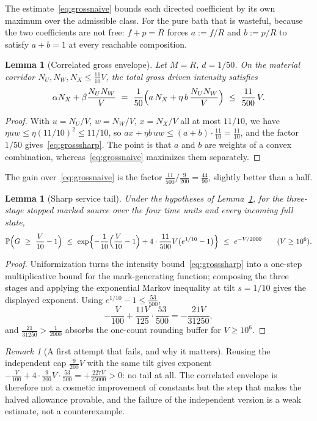 \documentclass[11pt,a4paper]{article}
\theoremstyle{plain}
\newtheorem{lemma}[theorem]{Lemma}
\theoremstyle{definition}
\theoremstyle{remark}
\newtheorem{remark}[theorem]{Remark}
\newcommand{\Prob}{\mathbb P}
\begin{document}
The estimate~\eqref{eq:grossnaive} bounds each directed coefficient by its own maximum over the admissible class. For the pure bath that is wasteful, because the two coefficients are not free: $f+p=R$ forces $a:=f/R$ and $b:=p/R$ to satisfy $a+b=1$ at every reachable composition.

\begin{lemma}[Correlated gross envelope]\label{lem:envelope}
Let $M=R$, $d=1/50$. On the material corridor $N_U,N_W,N_X\le\tfrac{11}{10}V$, the total gross driven intensity satisfies
\begin{equation}\label{eq:grosssharp}
\alpha N_X+\beta\frac{N_UN_W}V\ =\ \frac1{50}\Bigl(a\,N_X+\eta\,b\,\frac{N_UN_W}{V}\Bigr)\ \le\ \frac{11}{500}\,V .
\end{equation}
\end{lemma}
\begin{proof}
With $u=N_U/V$, $w=N_W/V$, $x=N_X/V$ all at most $11/10$, we have $\eta uw\le\eta(11/10)^2\le11/10$, so $ax+\eta b\,uw\le(a+b)\cdot\tfrac{11}{10}=\tfrac{11}{10}$, and the factor $1/50$ gives~\eqref{eq:grosssharp}. The point is that $a$ and $b$ are weights of a convex combination, whereas~\eqref{eq:grossnaive} maximizes them separately.
\end{proof}
The gain over~\eqref{eq:grossnaive} is the factor $\tfrac{11}{500}\big/\tfrac9{200}=\tfrac{44}{90}$, slightly better than a half.

\begin{lemma}[Sharp service tail]\label{lem:sharptail}
Under the hypotheses of Lemma~\ref{lem:envelope}, for the three-stage stopped marked source over the four time units and every incoming full state,
\[
\Prob\Bigl(G\ \ge\ \frac V{10}-1\Bigr)\ \le\ \exp\Bigl\{-\frac1{10}\Bigl(\frac V{10}-1\Bigr)+4\cdot\frac{11}{500}V\bigl(e^{1/10}-1\bigr)\Bigr\}\ \le\ e^{-V/2000}\qquad(V\ge10^6).
\]
\end{lemma}
\begin{proof}
Uniformization turns the intensity bound~\eqref{eq:grosssharp} into a one-step multiplicative bound for the mark-generating function; composing the three stages and applying the exponential Markov inequality at tilt $s=1/10$ gives the displayed exponent. Using $e^{1/10}-1\le\tfrac{53}{500}$,
\[
-\frac V{100}+\frac{11V}{125}\cdot\frac{53}{500}=-\frac{21V}{31250},
\]
and $\tfrac{21}{31250}>\tfrac1{2000}$ absorbs the one-count rounding buffer for $V\ge10^6$.
\end{proof}

\begin{remark}[A first attempt that fails, and why it matters]\label{rem:failed}
Reusing the independent cap $\tfrac9{200}V$ with the same tilt gives exponent $-\tfrac V{100}+4\cdot\tfrac9{200}V\cdot\tfrac{53}{500}=+\tfrac{227V}{25000}>0$: no tail at all. The correlated envelope is therefore not a cosmetic improvement of constants but the step that makes the halved allowance provable, and the failure of the independent version is a weak estimate, not a counterexample.
\end{remark}
\end{document}
